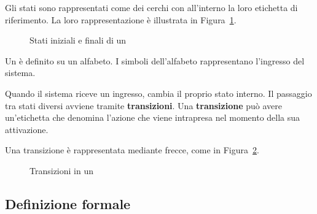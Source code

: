 \documentclass[italian, 10pt]{article}
\begin{document}
Gli stati sono rappresentati come dei cerchi con all'interno la loro etichetta di riferimento.
La loro rappresentazione è illustrata in Figura~\ref{fig:stati-iniziale-finale-FSA}.

\begin{figure}[htbp]
  \bigskip
  \centering
  \caption{Stati iniziali e finali di un \FSA}
  \label{fig:stati-iniziale-finale-FSA}
  \bigskip
\end{figure}

\bigskip
Un \FSA è definito su un alfabeto.
I simboli dell'alfabeto rappresentano l'ingresso del sistema.

\bigskip
Quando il sistema riceve un ingresso, cambia il proprio stato interno.
Il passaggio tra stati diversi avviene tramite \textbf{transizioni}.
Una \textbf{transizione} può avere un'etichetta che denomina l'azione che viene intrapresa nel momento della sua attivazione.

Una transizione è rappresentata mediante frecce, come in Figura~\ref{fig:transizioni-FSA}.

\begin{figure}[htbp]
  \bigskip
  \centering

  \caption{Transizioni in un \FSA}
  \label{fig:transizioni-FSA}
  \bigskip
\end{figure}

\subsection{Definizione formale \FSA}
\label{sec:definizione-formale-FSA}
\end{document}
